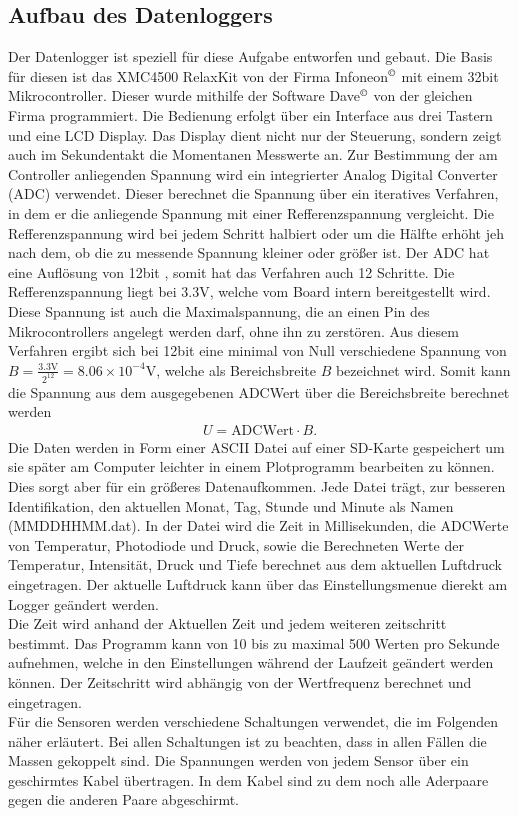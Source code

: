 \documentclass[12pt,a4paper,titlepage,headinclude,bibtotoc]{scrartcl}
\begin{document}
\subsection{Aufbau des Datenloggers}
Der Datenlogger ist speziell für diese Aufgabe entworfen und gebaut.
Die Basis für diesen ist das XMC4500 RelaxKit von der Firma Infoneon$^\copyright$ mit einem 32bit Mikrocontroller.
Dieser wurde mithilfe der Software Dave$^\copyright$ von der gleichen Firma programmiert.
Die Bedienung erfolgt über ein Interface aus drei Tastern und eine LCD Display.
Das Display dient nicht nur der Steuerung, sondern zeigt auch im Sekundentakt die Momentanen Messwerte an.
Zur Bestimmung der am Controller anliegenden Spannung wird ein integrierter Analog Digital Converter (ADC) verwendet.
Dieser berechnet die Spannung über ein iteratives Verfahren, in dem er die anliegende Spannung mit einer Refferenzspannung vergleicht.
Die Refferenzspannung wird bei jedem Schritt halbiert oder um die Hälfte erhöht jeh nach dem, ob die zu messende Spannung kleiner oder größer ist.
Der ADC hat eine Auflösung von 12bit %
, somit hat das Verfahren auch 12 Schritte.
Die Refferenzspannung liegt bei 3.3\si{\volt}, welche vom Board intern bereitgestellt wird.
Diese Spannung ist auch die Maximalspannung, die an einen Pin des Mikrocontrollers angelegt werden darf, ohne ihn zu zerstören.
Aus diesem Verfahren ergibt sich bei 12bit eine minimal von Null verschiedene Spannung von $B=\frac{3.3\si{\volt}}{2^{12}}=8.06\times10^{-4}\si{\volt}$, welche als Bereichsbreite $B$ bezeichnet wird.
Somit kann die Spannung aus dem ausgegebenen ADCWert über die Bereichsbreite berechnet werden
\begin{align}
	U=\text{ADCWert}\cdot B.\label{eq:ADCwert}
\end{align}
Die Daten werden in Form einer ASCII Datei auf einer SD-Karte gespeichert um sie später am Computer leichter in einem Plotprogramm bearbeiten zu können.
Dies sorgt aber für ein größeres Datenaufkommen.
Jede Datei trägt, zur besseren Identifikation, den aktuellen Monat, Tag, Stunde und Minute als Namen (MMDDHHMM.dat).
In der Datei wird die Zeit in Millisekunden, die ADCWerte von Temperatur, Photodiode und Druck, sowie die Berechneten Werte der Temperatur, Intensität, Druck und Tiefe berechnet aus dem aktuellen Luftdruck eingetragen.
Der aktuelle Luftdruck kann über das Einstellungsmenue dierekt am Logger geändert werden.\\
Die Zeit wird anhand der Aktuellen Zeit und jedem weiteren zeitschritt bestimmt.
Das Programm kann von 10 bis zu maximal 500 Werten pro Sekunde aufnehmen, welche in den Einstellungen während der Laufzeit geändert werden können.
Der Zeitschritt wird abhängig von der Wertfrequenz berechnet und eingetragen.\\
Für die Sensoren werden verschiedene Schaltungen verwendet, die im Folgenden näher erläutert.
Bei allen Schaltungen ist zu beachten, dass in allen Fällen die Massen gekoppelt sind.
Die Spannungen werden von jedem Sensor über ein geschirmtes Kabel übertragen.
In dem Kabel sind zu dem noch alle Aderpaare gegen die anderen Paare abgeschirmt.
\end{document}
